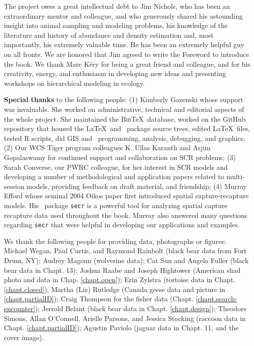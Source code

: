 
The project owes a great intellectual debt to Jim Nichols, who has
been an extraordinary mentor and colleague,
and who generously shared his
astounding insight into animal sampling and modeling problems, his
knowledge
of the literature and history of abundance and density estimation
and, most importantly, his extremely valuable time.
He has
been
an 
extremely helpful guy on all fronts. We are honored that Jim
agreed to write the Foreword to introduce the book. 
 We thank Marc K\'{e}ry
for being a great friend and colleague, and for his creativity, 
energy, and enthusiasm in developing new ideas and
presenting workshops on hierarchical modeling in ecology.

{\bf Special thanks} to the following people: (1) Kimberly Gazenski whose support was
invaluable. She worked on administrative, technical and editorial
aspects of the whole project. She maintained the \textsc{Bib}\TeX~database,
worked on the GitHub repository that housed the \LaTeX~and \R~package
source trees, edited \LaTeX~files, tested R scripts, did GIS and
\R~programming, analysis, debugging, and graphics;  (2) Our WCS Tiger
program colleagues K. Ullas Karanth and Arjun Gopalaswamy for
continued support and collaboration on SCR problems;  (3) Sarah
Converse, our PWRC colleague, for her interest in SCR models and
developing a number of methodological and application papers related
to multi-session models, providing feedback on draft material, and
friendship;  (4) Murray Efford whose seminal 2004 Oikos paper first introduced spatial
capture-recapture models.  His \R~package \mbox{\tt secr} 
is a powerful tool for analyzing
spatial capture recapture data used
throughout the book. Murray also answered many questions regarding \mbox{\tt secr} that 
were helpful in developing our applications and examples.

We thank the following people for providing data, photographs or figures:
Michael Wegan, Paul Curtis, and Raymond Rainbolt (black bear data from Fort Drum, NY);
Audrey Magoun (wolverine data); Cat Sun and Angela Fuller (black bear
data in Chapt. 13); Joshua Raabe and Joseph Hightower (American shad
photo and data in Chap. \ref{chapt.open}); Erin Zylstra (tortoise
data in Chapt. \ref{chapt.closed}); Martha (Liz) Rutledge (Canada geese
data and picture in \ref{chapt.partialID});  Craig Thompson for the
fisher data (Chapt. \ref{chapt.search-encounter});
Jerrold Belant (black bear data
in Chapt. \ref{chapt.design}); Theodore Simons, Allan O'Connell,
Arielle Parsons, and Jessica Stocking (raccoon data in Chapt.
\ref{chapt.partialID}); Agustin Paviolo (jaguar data in Chapt. 11, and
the cover image).

